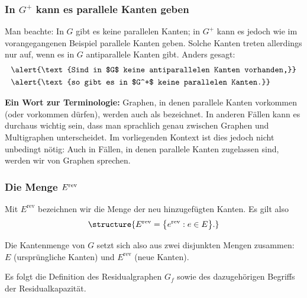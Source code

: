 \documentclass[smaller]{beamer}
\begin{document}
\begin{frame}
 \frametitle{In $G^+$ kann es parallele Kanten geben}
 Man beachte: In $G$ gibt es keine parallelen Kanten; in $G^+$ kann es jedoch wie im vorangegangenen Beispiel \alert{parallele Kanten} geben. Solche Kanten treten allerdings nur auf, wenn es in $G$ antiparallele Kanten gibt. Anders gesagt:
\begin{align*}
& \alert{\text{Sind in $G$ keine antiparallelen Kanten vorhanden,}} \\ &\alert{\text{so gibt es in $G^+$ keine parallelen Kanten.}}
\end{align*}

\textbf{Ein Wort zur Terminologie:} Graphen, in denen parallele Kanten vorkommen (oder vorkommen dürfen), werden auch als  bezeichnet. In anderen Fällen kann es durchaus wichtig sein, dass man sprachlich genau zwischen {\glqq}Graphen{\grqq} und {\glqq}Multigraphen{\grqq} unterscheidet. Im vorliegenden Kontext ist dies jedoch nicht unbedingt nötig: Auch in Fällen, in denen parallele Kanten zugelassen sind, werden wir von \alert{Graphen} sprechen.
\end{frame}

\begin{frame}
 \frametitle{Die Menge $E^{\rm rev}$}
 Mit $E^{\text{rev}}$ bezeichnen wir die Menge der neu hinzugefügten Kanten. Es gilt also
 \[
 \structure{ E^{\text{rev}} = \big\{ e^{\text{rev}} : e \in E \big\}.}
 \]

Die Kantenmenge von $G$ setzt sich also aus zwei disjunkten Mengen zusammen: $E$ (ursprüngliche Kanten) und $E^{\text{rev}}$ (neue Kanten). \\ \vspace*{0.2cm}

Es folgt die Definition des \alert{Residualgraphen} $G_f$ sowie des dazugehörigen Begriffs der \alert{Residualkapazität}.
\end{frame}
\end{document}
